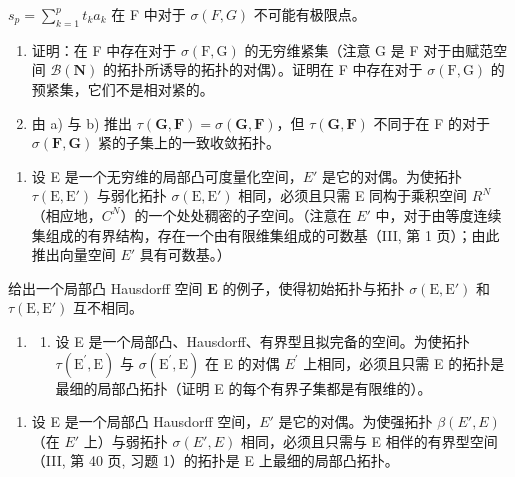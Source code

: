 \(s_{p} = \sum_{k=1}^{p} t_k a_k\) 在 F 中对于 \(\sigma(F, G)\) 不可能有极限点。

\begin{enumerate}
\def\labelenumi{\alph{enumi})}
\setcounter{enumi}{1}
\item
  证明：在 F 中存在对于 \(\sigma(\mathrm{F},\mathrm{G})\) 的无穷维紧集（注意 G 是 F 对于由赋范空间 \(\mathcal{B}(\mathbf{N})\) 的拓扑所诱导的拓扑的对偶）。证明在 F 中存在对于 \(\sigma(\mathrm{F},\mathrm{G})\) 的预紧集，它们不是相对紧的。
\item
  由 a) 与 b) 推出 \(\tau(\mathbf{G},\mathbf{F})=\sigma(\mathbf{G},\mathbf{F})\)，但 \(\tau(\mathbf{G},\mathbf{F})\) 不同于在 F 的对于 \(\sigma(\mathbf{F},\mathbf{G})\) 紧的子集上的一致收敛拓扑。
\end{enumerate}

\begin{enumerate}
\def\labelenumi{\arabic{enumi})}
\setcounter{enumi}{7}
\tightlist
\item
  设 E 是一个无穷维的局部凸可度量化空间，\(E'\) 是它的对偶。为使拓扑 \(\tau(\mathrm{E}, \mathrm{E}')\) 与弱化拓扑 \(\sigma(\mathrm{E}, \mathrm{E}')\) 相同，必须且只需 E 同构于乘积空间 \(R^{N}\)（相应地，\(C^{N}\)）的一个处处稠密的子空间。（注意在 \(E'\) 中，对于由等度连续集组成的有界结构，存在一个由有限维集组成的可数基（III, 第 1 页）；由此推出向量空间 \(E'\) 具有可数基。）
\end{enumerate}

给出一个局部凸 Hausdorff 空间 \(\mathbf{E}\) 的例子，使得初始拓扑与拓扑 \(\sigma(\mathrm{E},\mathrm{E}')\) 和 \(\tau(\mathrm{E},\mathrm{E}')\) 互不相同。

\begin{enumerate}
\def\labelenumi{\arabic{enumi})}
\setcounter{enumi}{8}
\tightlist
\item
  \begin{enumerate}
  \def\labelenumii{\alph{enumii})}
  \tightlist
  \item
    设 E 是一个局部凸、Hausdorff、有界型且拟完备的空间。为使拓扑 \(\tau(\mathrm{E}^{\prime},\mathrm{E})\) 与 \(\sigma(\mathrm{E}^{\prime},\mathrm{E})\) 在 E 的对偶 \(E^{\prime}\) 上相同，必须且只需 E 的拓扑是最细的局部凸拓扑（证明 E 的每个有界子集都是有限维的）。
  \end{enumerate}
\end{enumerate}

\begin{enumerate}
\def\labelenumi{\alph{enumi})}
\setcounter{enumi}{1}
\tightlist
\item
  设 E 是一个局部凸 Hausdorff 空间，\(E'\) 是它的对偶。为使强拓扑 \(\beta(E', E)\)（在 \(E'\) 上）与弱拓扑 \(\sigma(E', E)\) 相同，必须且只需与 E 相伴的有界型空间（III, 第 40 页, 习题 1）的拓扑是 E 上最细的局部凸拓扑。
\end{enumerate}

